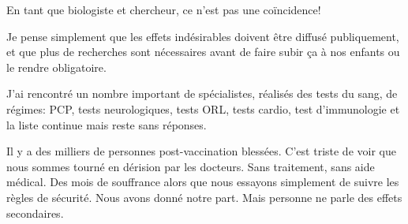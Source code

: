 En tant que biologiste et chercheur, ce n'est pas une coïncidence!

Je pense simplement que les effets indésirables doivent être diffusé
publiquement, et que plus de recherches sont nécessaires avant de faire subir ça
à nos enfants ou le rendre obligatoire.

J'ai rencontré un nombre important de spécialistes, réalisés des tests du sang,
de régimes: PCP, tests neurologiques, tests ORL, tests cardio, test
d'immunologie et la liste continue mais reste sans réponses.

Il y a des milliers de personnes post-vaccination blessées. C'est triste de voir
que nous sommes tourné en dérision par les docteurs. Sans traitement, sans aide
médical. Des mois de souffrance alors que nous essayons simplement de suivre les
règles de sécurité. Nous avons donné notre part. Mais personne ne parle des
effets secondaires.

